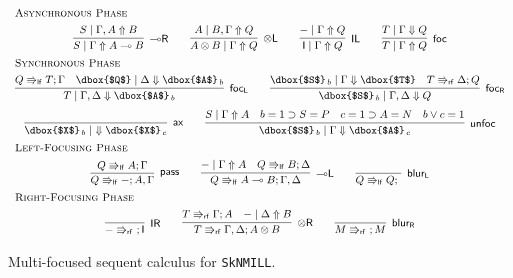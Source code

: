 \documentclass[runningheads]{llncs}
\newcommand{\tl}{\otimes \mathsf{L}}
\newcommand{\tr}{\otimes \mathsf{R}}
\newcommand{\lright}{{\multimap}\mathsf{R}}
\newcommand{\lleft}{{\multimap}\mathsf{L}}
\newcommand{\pass}{\mathsf{pass}}
\newcommand{\unitl}{\mathsf{IL}}
\newcommand{\unitr}{\mathsf{IR}}
\newcommand{\otL}{\tl}
\newcommand{\otR}{\tr}
\newcommand{\lolliR}{\lright}
\newcommand{\lolliL}{\lleft}
\newcommand{\IL}{\unitl}
\newcommand{\IR}{\unitr}
\newcommand{\ax}{\mathsf{ax}}
\newcommand{\ot}{\otimes}
\newcommand{\lolli}{\multimap}
\newcommand{\I}{\mathsf{I}}
\newcommand{\lf}{\Rrightarrow_\mathsf{lf}}
\newcommand{\rf}{\Rrightarrow_\mathsf{rf}}
\newcommand{\SkNMILL}{\texttt{SkNMILL}}
\newcommand{\up}{\Uparrow}
\newcommand{\dn}{\Downarrow}
\newcommand{\focL}{\mathsf{foc_L}}
\newcommand{\foc}{\mathsf{foc}}
\newcommand{\focR}{\mathsf{foc_R}}
\newcommand{\blurL}{\mathsf{blur_L}}
\newcommand{\blurR}{\mathsf{blur_R}}
\newcommand{\unfoc}{\mathsf{unfoc}}
\begin{document}
\begin{figure}[t]
  \[
  \small
  \begin{array}{c}
    \multicolumn{1}{l}{\text{\textsc{Asynchronous Phase}}} \\[4pt]
      \infer[\lolliR]{S \mid \Gamma \up A \lolli B}{S \mid \Gamma , A \up B}
    \qquad
    \infer[\otL]{A \ot B \mid \Gamma \up Q}{A \mid  B , \Gamma \up Q}
    \qquad
      \infer[\IL]{\I \mid \Gamma \up Q}{- \mid \Gamma \up Q}    
    \qquad
        \infer[\foc]{T \mid \Gamma \up Q}{
      T \mid \Gamma \dn Q
    }
    \\[4pt]
    \multicolumn{1}{l}{\text{\textsc{Synchronous Phase}}} \\[4pt]
        \infer[\focL]{T \mid \Gamma , \Delta \dn \dbox{$A$}_{\, b}}{
          Q \lf T ; \Gamma &
          \dbox{$Q$} \mid \Delta \dn \dbox{$A$}_{\, b}
        }
    \qquad
    \infer[\focR]{\dbox{$S$}_{\, b} \mid \Gamma,\Delta \dn Q}{
      \dbox{$S$}_{\, b} \mid \Gamma \dn \dbox{$T$}
      &
      T \rf \Delta ; Q
    }
    \\[6pt]
        \infer[\ax]{\dbox{$X$}_{\, b} \mid ~ \dn \dbox{$X$}_{\, c}}{}
    \qquad
    \infer[\unfoc]{\dbox{$S$}_{\,b} \mid \Gamma \dn \dbox{$A$}_{\,c}}{
      S \mid \Gamma \up A
      &
      b = 1 \supset S = P
      &
      c = 1 \supset A = N
      &
      b \vee c = 1
    }
    \\[4pt]
    \multicolumn{1}{l}{\text{\textsc{Left-Focusing Phase}}} \\[4pt]
    \infer[\pass]{Q \lf - ; A , \Gamma}{
      Q \lf A ; \Gamma
    }
    \qquad
    \infer[\lolliL]{Q \lf A \lolli B ; \Gamma , \Delta}{
      - \mid \Gamma \up A
      &
      Q \lf B ;  \Delta
    }
    \qquad
        \infer[\blurL]{Q \lf Q ; ~}{
      }    
    \\[4pt]
    \multicolumn{1}{l}{\text{\textsc{Right-Focusing Phase}}} \\[4pt]
    \infer[\IR]{- \rf ~ ; \I}{}
    \qquad
    \infer[\otR]{T \rf \Gamma , \Delta ; A \ot B}{
      T \rf \Gamma ; A
      &
      - \mid \Delta \up B
    }
    \qquad
        \infer[\blurR]{M \rf ~ ; M}{}
    \end{array}
  \]
  \caption{Multi-focused sequent calculus for \SkNMILL.} 
  \label{fig:multi-focus}
\end{figure}
\end{document}

